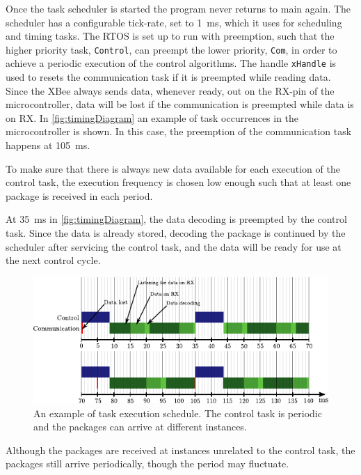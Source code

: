 Once the task scheduler is started the program never returns to main again. The scheduler has a configurable tick-rate, set to \SI{1}{ms}, which it uses for scheduling and timing tasks. The RTOS is set up to run with preemption, such that the higher priority task, \lstinline[style=customcppinline]{Control}, can preempt the lower priority, \lstinline[style=customcppinline]{Com}, in order to achieve a periodic execution of the control algorithms. The handle \lstinline[style=customcppinline]{xHandle} is used to resets the communication task if it is preempted while reading data. Since the XBee always sends data, whenever ready, out on the RX-pin of the microcontroller, data will be lost if the communication is preempted while data is on RX. In \autoref{fig:timingDiagram} an example of task occurrences in the microcontroller is shown. In this case, the preemption of the communication task happens at \SI{105}{ms}.

To make sure that there is always new data available for each execution of the control task, the execution frequency is chosen low enough such that at least one package is received in each period.

At \SI{35}{ms} in \autoref{fig:timingDiagram}, the data decoding is preempted by the control task. Since the data is already stored, decoding the package is continued by the scheduler after servicing the control task, and the data will be ready for use at the next control cycle.

\begin{figure}[H]
    \flushleft
    \includegraphics[width =.95\textwidth]{figures/timingDiagram}	
    \caption{An example of task execution schedule. The control task is periodic and the packages can arrive at different instances.} 
    \label{fig:timingDiagram}
\end{figure}

Although the packages are received at instances unrelated to the control task, the packages still arrive periodically, though the period may fluctuate.